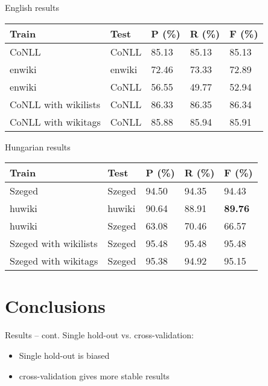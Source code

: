 \documentclass[utf8x,t]{beamer}
\newcommand{\vitem}{\vfill \item}
\begin{document}
\begin{frame}{English results}

\begin{center}
\begin{tabular}{lllll}
\hline \bf Train & \bf Test & \bf P (\%) & \bf R (\%) & \bf F (\%) \\ \hline
CoNLL & CoNLL & 85.13 & 85.13 & 85.13 \\
enwiki & enwiki & 72.46 & 73.33 &  72.89 \\
enwiki & CoNLL & 56.55 & 49.77 & 52.94 \\
CoNLL with wikilists & CoNLL & 86.33 & 86.35 & 86.34 \\
CoNLL with wikitags & CoNLL & 85.88 & 85.94 & 85.91 \\
\hline
\end{tabular}
\end{center}

\end{frame}

\begin{frame}{Hungarian results}

\begin{center}
\begin{tabular}{lllll}
\hline \bf Train & \bf Test & \bf P (\%) & \bf R (\%) & \bf F (\%) \\ \hline
Szeged  & Szeged  & 94.50 & 94.35 & 94.43 \\
huwiki & huwiki & 90.64 & 88.91 &  \textbf{89.76} \\
huwiki & Szeged  & 63.08 & 70.46 & 66.57 \\
Szeged  with wikilists & Szeged  & 95.48 & 95.48 & 95.48 \\
Szeged  with wikitags & Szeged  & 95.38 & 94.92 & 95.15 \\
\hline
\end{tabular}
\end{center}


\end{frame}

\section{Conclusions}
\begin{frame}{Results -- cont.}
  Single hold-out vs. cross-validation:
  \begin{itemize}
  \vitem Single hold-out is biased
  \vitem cross-validation gives more stable results
  \end{itemize}
  \vfill
\end{frame}
\end{document}
